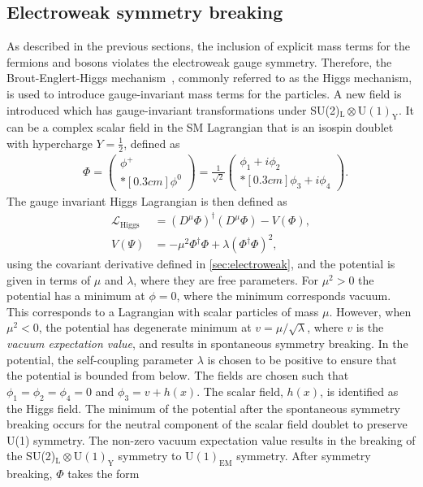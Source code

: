 \subsection{Electroweak symmetry breaking}\label{sec:symmbreak}
As described in the previous sections, the inclusion of explicit mass terms for the fermions and bosons violates the electroweak gauge symmetry. Therefore, the Brout-Englert-Higgs mechanism~\cite{Higgs1964,Englert1964}, commonly referred to as the Higgs mechanism, is used to introduce gauge-invariant mass terms for the particles. A new field is introduced which has gauge-invariant transformations under SU(2)$_\mathrm{L}\otimes\mathrm{U(1)}_\mathrm{Y}$. It can be a complex scalar field in the SM Lagrangian that is an isospin doublet with hypercharge $Y = \frac{1}{2}$, defined as
\begin{equation}\renewcommand*{\arraystretch}{\newarraystrech}
    \label{eq:scalarfield}
    \begin{aligned}
        & \Phi = 
        \begin{pmatrix}
            \phi^+ \\*[0.3cm]
            \phi^0 
        \end{pmatrix} =
        \frac{1}{\sqrt{2}} 
        \begin{pmatrix}
            \phi_1 + i\phi_2 \\*[0.3cm]
            \phi_3 + i\phi_4
        \end{pmatrix}.
     \end{aligned}
\end{equation}
The gauge invariant Higgs Lagrangian is then defined as
\begin{equation}
    \label{eq:lagrangianhiggs}
    \begin{aligned}
        \mathcal{L}_\mathrm{Higgs} &= (D^\mu\Phi)^\dagger(D^\mu\Phi) - V(\Phi), \\
        V(\Psi) &= - \mu^2\Phi^\dagger\Phi + \lambda(\Phi^\dagger\Phi)^2,
     \end{aligned}
\end{equation}
using the covariant derivative defined in \cref{sec:electroweak}, and the potential is given in terms of $\mu$ and $\lambda$, where they are free parameters. For $\mu^2 > 0$ the potential has a minimum at $\phi = 0$, where the minimum corresponds vacuum. This corresponds to a Lagrangian with scalar particles of mass $\mu$. However, when $\mu^2 < 0$, the potential has degenerate minimum at $v = \mu/\sqrt{\lambda}$, where $v$ is the \emph{vacuum expectation value}, and results in spontaneous symmetry breaking. In the potential, the self-coupling parameter $\lambda$ is chosen to be positive to ensure that the potential is bounded from below. The fields are chosen such that $\phi_1 = \phi_2 = \phi_4 = 0$ and $\phi_3 = v + h(x)$. The scalar field, $h(x)$, is identified as the Higgs field. The minimum of the potential after the spontaneous symmetry breaking occurs for the neutral component of the scalar field doublet to preserve U(1) symmetry. The non-zero vacuum expectation value results in the breaking of the SU(2)$_\mathrm{L}\otimes\mathrm{U(1)}_\mathrm{Y}$ symmetry to $\mathrm{U(1)}_\mathrm{EM}$ symmetry. After symmetry breaking, $\Phi$ takes the form 
